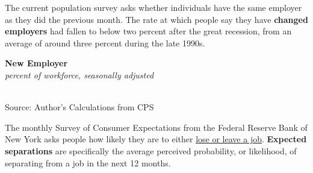 \documentclass{report}
\makeatletter
\newcommand{\tbllink}[1]{\href{https://raw.githubusercontent.com/bdecon/US-chartbook/master/chartbook/data/#1}{\faTable}}
\newcommand*\short[1]{\expandafter\@gobbletwo\number\numexpr#1\relax}
\newcommand{\dateaxisticks}{
		date coordinates in=x, axis line style={draw=none},
		xmax={2022-10-31},
		max space between ticks=40,	    
		xtick={{1990-01-01}, {1992-01-01}, {1994-01-01}, 
			{1996-01-01}, {1998-01-01}, {2000-01-01}, 
			{2002-01-01}, {2004-01-01}, {2006-01-01},
			{2008-01-01}, {2010-01-01}, {2012-01-01}, {2014-01-01},
		    {2016-01-01}, {2018-01-01}, {2020-01-01}, {2022-01-01}, 
		    {2024-01-01}, {2026-01-01}},
		minor xtick={{1989-01-01}, {1991-01-01}, {1993-01-01},
			{1995-01-01}, {1997-01-01}, {1999-01-01}, 
			{2001-01-01}, {2003-01-01}, {2005-01-01}, {2007-01-01},
		    {2009-01-01}, {2011-01-01}, {2013-01-01}, {2015-01-01},
		    {2017-01-01}, {2019-01-01}, {2021-01-01}, {2023-01-01}, 
		    {2025-01-01}, {2027-01-01}},
		enlarge y limits={0.06}, enlarge x limits={0.01},
		}
\newcommand{\stdline}[4]{\addplot[very thick, no markers, color=#1] 
		table [x=#2, y=#3, col sep=comma] {#4};	}
\newcommand{\thickline}[4]{\addplot[ultra thick, no markers, color=#1] 
		table [x=#2, y=#3, col sep=comma] {#4};	}
\newcommand{\rebars}{
		\fill[color=black!10] (axis cs:{2007-12-01},\pgfkeysvalueof{/pgfplots/ymin}) rectangle 
			(axis cs:{2009-07-01}, \pgfkeysvalueof{/pgfplots/ymax});
		\fill[color=black!10] (axis cs:{2001-03-01},\pgfkeysvalueof{/pgfplots/ymin}) rectangle 
			(axis cs:{2001-11-01}, \pgfkeysvalueof{/pgfplots/ymax});
		\fill[color=black!10] (axis cs:{2020-02-01},\pgfkeysvalueof{/pgfplots/ymin}) rectangle 
			(axis cs:{2020-05-01}, \pgfkeysvalueof{/pgfplots/ymax});}
\makeatother
\begin{document}
{\begin{minipage}{0.76\textwidth}
The current population survey asks whether individuals have the same employer as they did the previous month. The rate at which people say they have \textbf{changed employers} had fallen to below two percent after the great recession, from an average of around three percent during the late 1990s. 

 
\vspace{1mm}

\normalsize \textbf{New Employer}\\
\footnotesize{\textit{percent of workforce, seasonally adjusted}}\\
\hspace*{-2mm} \\
\footnotesize{Source: Author's Calculations from CPS} \hfill \tbllink{jobswitch.csv} 
\vspace{5mm}

\small The monthly Survey of Consumer Expectations from the Federal Reserve Bank of New York asks people how likely they are to either \href{https://www.newyorkfed.org/microeconomics/sce#/jobsep-1}{lose or leave a job}. \textbf{Expected separations} are specifically the average perceived probability, or likelihood, of separating from a job in the next 12 months. 


\end{minipage}}
\end{document}
